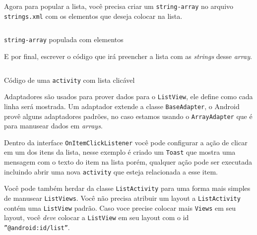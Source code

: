 \documentclass[a4paper,12pt,brazil,doubleside]{book}
\begin{document}
\begin{singlespace}
Agora para popular a lista, você precisa criar um \texttt{string-array} no arquivo \texttt{\textcolor{mygreen}{strings.xml}} com os elementos que deseja colocar na lista.

\begin{listing}[H]
\inputminted[linenos=true,fontsize=\small,frame=lines, framesep=2mm, tabsize=2,numbersep=5pt]{xml}{../../src/android/design/string-array.xml}
\caption{\texttt{string-array} populada com elementos}
\end{listing}

E por final, escrever o código que irá preencher a lista com as \textit{strings} desse \textit{array}.

\begin{listing}[H]
\inputminted[linenos=true,fontsize=\small,frame=lines, framesep=2mm, tabsize=2,numbersep=5pt]{java}{../../src/android/design/listactivity.java}
\caption{Código de uma \texttt{activity} com lista clicável}
\end{listing}

Adaptadores são usados para prover dados para o \texttt{ListView}, ele define como cada linha será mostrada. Um adaptador extende a classe \texttt{BaseAdapter}, o Android provê alguns adaptadores padrões, no caso estamos usando o \texttt{ArrayAdapter} que é para manusear dados em \textit{arrays}.

Dentro da interface \texttt{OnItemClickListener} você pode configurar a ação de clicar em um dos itens da lista, nesse exemplo é criado um \texttt{Toast} que mostra uma mensagem com o texto do item na lista porém, qualquer ação pode ser executada incluindo abrir uma nova \texttt{activity} que esteja relacionada a esse item.

Você pode também herdar da classe \texttt{ListActivity} para uma forma mais simples de manusear \texttt{ListViews}. Você não precisa atribuir um layout a \texttt{ListActivity} contém uma \texttt{ListView} padrão. Caso voce precise colocar mais \texttt{Views} em seu layout, você \emph{deve} colocar a \texttt{ListView} em seu layout com o id \texttt{''@android:id/list''}.


\end{singlespace}
\end{document}
